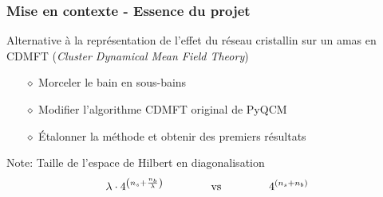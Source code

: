 
\begin{frame}
    \frametitle{Mise en contexte - Essence du projet}
    Alternative à la représentation de l'effet du réseau
    cristallin sur un amas en CDMFT (\textit{Cluster Dynamical Mean Field Theory})
    \vspace{0.3cm}
    \begin{itemize}
        \pause
        \item[$\diamond$] Morceler le bain en sous-bains
        \item[$\diamond$] Modifier l'algorithme CDMFT original de PyQCM\footnotemark
        \item[$\diamond$] Étalonner la méthode et obtenir des premiers résultats
    \end{itemize}
    \vfill
    \pause
    \begin{noteblock}{Note: Taille de l'espace de Hilbert en diagonalisation}
        \begin{align*}
            \lambda\cdot 4^{\qty(n_s + \frac{n_b}{\lambda})}\hspace{1.5cm}\text{vs}\hspace{1.5cm}
          4^{(n_s + n_b)}
        \end{align*}
    \end{noteblock}
\end{frame}
